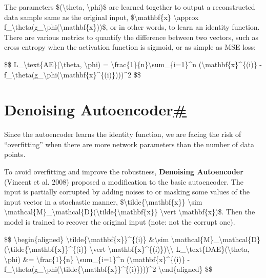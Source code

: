 The parameters \$(\textbackslash theta, \textbackslash phi)\$ are learned together to output a reconstructed data sample same as the original input, \$\textbackslash mathbf\{x\} \textbackslash approx f\_\textbackslash theta(g\_\textbackslash phi(\textbackslash mathbf\{x\}))\$, or in other words, to learn an identity function. There are various metrics to quantify the difference between two vectors, such as cross entropy when the activation function is sigmoid, or as simple as MSE loss:

\$\$ L\_\textbackslash text\{AE\}(\textbackslash theta, \textbackslash phi) = \textbackslash frac\{1\}\{n\}\textbackslash sum\_\{i=1\}\^{}n (\textbackslash mathbf\{x\}\^{}\{(i)\} - f\_\textbackslash theta(g\_\textbackslash phi(\textbackslash mathbf\{x\}\^{}\{(i)\})))\^{}2 \$\$

\section{\texorpdfstring{Denoising Autoencoder\hyperref[denoising-autoencoder]{\#}}{Denoising Autoencoder\#}}\label{denoising-autoencoder}

Since the autoencoder learns the identity function, we are facing the risk of ``overfitting'' when there are more network parameters than the number of data points.

To avoid overfitting and improve the robustness, \textbf{Denoising Autoencoder} (Vincent et al. 2008) proposed a modification to the basic autoencoder. The input is partially corrupted by adding noises to or masking some values of the input vector in a stochastic manner, \$\textbackslash tilde\{\textbackslash mathbf\{x\}\} \textbackslash sim \textbackslash mathcal\{M\}\_\textbackslash mathcal\{D\}(\textbackslash tilde\{\textbackslash mathbf\{x\}\} \textbackslash vert \textbackslash mathbf\{x\})\$. Then the model is trained to recover the original input (note: not the corrupt one).

\$\$ \textbackslash begin\{aligned\} \textbackslash tilde\{\textbackslash mathbf\{x\}\}\^{}\{(i)\} \&\textbackslash sim \textbackslash mathcal\{M\}\_\textbackslash mathcal\{D\}(\textbackslash tilde\{\textbackslash mathbf\{x\}\}\^{}\{(i)\} \textbackslash vert \textbackslash mathbf\{x\}\^{}\{(i)\})\textbackslash\textbackslash{} L\_\textbackslash text\{DAE\}(\textbackslash theta, \textbackslash phi) \&= \textbackslash frac\{1\}\{n\} \textbackslash sum\_\{i=1\}\^{}n (\textbackslash mathbf\{x\}\^{}\{(i)\} - f\_\textbackslash theta(g\_\textbackslash phi(\textbackslash tilde\{\textbackslash mathbf\{x\}\}\^{}\{(i)\})))\^{}2 \textbackslash end\{aligned\} \$\$

